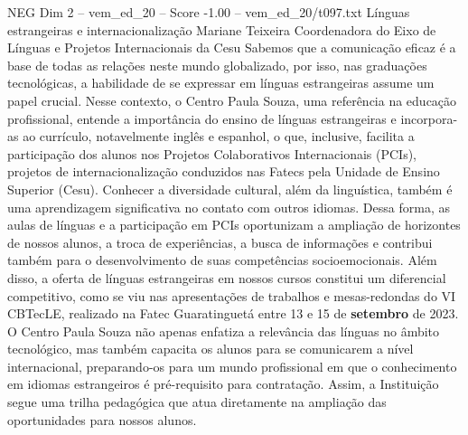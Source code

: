\begin{textsample}{NEG Dim 2 – vem\_ed\_20 – Score -1.00 – vem\_ed\_20/t097.txt}  \label{ex:f2_neg_004}
Línguas estrangeiras e internacionalização Mariane Teixeira Coordenadora do Eixo de Línguas e Projetos Internacionais da Cesu Sabemos que a comunicação eficaz é a base de todas as relações neste mundo globalizado, por isso, nas graduações tecnológicas, a habilidade de se expressar em línguas estrangeiras assume um papel crucial.
Nesse contexto, o Centro Paula Souza, uma referência na educação profissional, entende a importância do ensino de línguas estrangeiras e incorpora-as ao currículo, notavelmente inglês e espanhol, o que, inclusive, facilita a participação dos alunos nos Projetos Colaborativos Internacionais (PCIs), projetos de internacionalização conduzidos nas Fatecs pela Unidade de Ensino Superior (Cesu).
Conhecer a diversidade cultural, além da linguística, também é uma aprendizagem significativa no contato com outros idiomas.
Dessa forma, as aulas de línguas e a participação em PCIs oportunizam a ampliação de horizontes de nossos alunos, a troca de experiências, a busca de informações e contribui também para o desenvolvimento de suas competências socioemocionais.
Além disso, a oferta de línguas estrangeiras em nossos cursos constitui um diferencial competitivo, como se viu nas apresentações de trabalhos e mesas-redondas do VI CBTecLE, realizado na Fatec Guaratinguetá entre 13 e 15 de \textbf{setembro} de 2023.
O Centro Paula Souza não apenas enfatiza a relevância das línguas no âmbito tecnológico, mas também capacita os alunos para se comunicarem a nível internacional, preparando-os para um mundo profissional em que o conhecimento em idiomas estrangeiros é pré-requisito para contratação.
Assim, a Instituição segue uma trilha pedagógica que atua diretamente na ampliação das oportunidades para nossos alunos.

\end{textsample}
